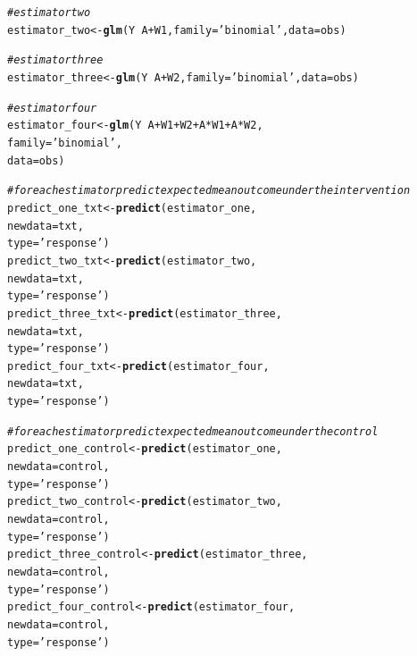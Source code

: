 \documentclass{article}\usepackage[]{graphicx}\usepackage[]{xcolor}
\makeatletter
\newcommand{\hlstr}[1]{\textcolor[rgb]{0.192,0.494,0.8}{#1}}%
\newcommand{\hlcom}[1]{\textcolor[rgb]{0.678,0.584,0.686}{\textit{#1}}}%
\newcommand{\hlopt}[1]{\textcolor[rgb]{0,0,0}{#1}}%
\newcommand{\hlstd}[1]{\textcolor[rgb]{0.345,0.345,0.345}{#1}}%
\newcommand{\hlkwb}[1]{\textcolor[rgb]{0.69,0.353,0.396}{#1}}%
\newcommand{\hlkwc}[1]{\textcolor[rgb]{0.333,0.667,0.333}{#1}}%
\newcommand{\hlkwd}[1]{\textcolor[rgb]{0.737,0.353,0.396}{\textbf{#1}}}%
\newenvironment{kframe}{%
 \def\at@end@of@kframe{}%
 \ifinner\ifhmode%
  \def\at@end@of@kframe{\end{minipage}}%
  \begin{minipage}{\columnwidth}%
 \fi\fi%
 \def\FrameCommand##1{\hskip\@totalleftmargin \hskip-\fboxsep
 \colorbox{shadecolor}{##1}\hskip-\fboxsep
     \hskip-\linewidth \hskip-\@totalleftmargin \hskip\columnwidth}%
 \MakeFramed {\advance\hsize-\width
   \@totalleftmargin\z@ \linewidth\hsize
   \@setminipage}}%
 {\par\unskip\endMakeFramed%
 \at@end@of@kframe}
\newenvironment{knitrout}{}{} %
\makeatother
\begin{document}
\begin{knitrout}
\begin{kframe}
\begin{alltt}
  \hlcom{# estimator two}
  \hlstd{estimator_two} \hlkwb{<-} \hlkwd{glm}\hlstd{(Y} \hlopt{~} \hlstd{A} \hlopt{+} \hlstd{W1,} \hlkwc{family} \hlstd{=} \hlstr{'binomial'}\hlstd{,} \hlkwc{data} \hlstd{= obs)}

  \hlcom{# estimator three}
  \hlstd{estimator_three} \hlkwb{<-} \hlkwd{glm}\hlstd{(Y} \hlopt{~} \hlstd{A} \hlopt{+} \hlstd{W2,} \hlkwc{family} \hlstd{=} \hlstr{'binomial'}\hlstd{,} \hlkwc{data} \hlstd{= obs)}

  \hlcom{# estimator four}
  \hlstd{estimator_four} \hlkwb{<-} \hlkwd{glm}\hlstd{(Y} \hlopt{~} \hlstd{A} \hlopt{+} \hlstd{W1} \hlopt{+} \hlstd{W2} \hlopt{+} \hlstd{A}\hlopt{*}\hlstd{W1} \hlopt{+} \hlstd{A}\hlopt{*}\hlstd{W2,}
                        \hlkwc{family} \hlstd{=} \hlstr{'binomial'}\hlstd{,}
                        \hlkwc{data} \hlstd{= obs)}

  \hlcom{# for each estimator predict expected mean outcome under the intervention}
  \hlstd{predict_one_txt} \hlkwb{<-} \hlkwd{predict}\hlstd{(estimator_one,}
                             \hlkwc{newdata} \hlstd{= txt,}
                             \hlkwc{type} \hlstd{=} \hlstr{'response'}\hlstd{)}
  \hlstd{predict_two_txt} \hlkwb{<-} \hlkwd{predict}\hlstd{(estimator_two,}
                             \hlkwc{newdata} \hlstd{= txt,}
                             \hlkwc{type} \hlstd{=} \hlstr{'response'}\hlstd{)}
  \hlstd{predict_three_txt} \hlkwb{<-} \hlkwd{predict}\hlstd{(estimator_three,}
                               \hlkwc{newdata} \hlstd{= txt,}
                               \hlkwc{type} \hlstd{=} \hlstr{'response'}\hlstd{)}
  \hlstd{predict_four_txt} \hlkwb{<-} \hlkwd{predict}\hlstd{(estimator_four,}
                              \hlkwc{newdata} \hlstd{= txt,}
                              \hlkwc{type} \hlstd{=} \hlstr{'response'}\hlstd{)}

  \hlcom{# for each estimator predict expected mean outcome under the control}
  \hlstd{predict_one_control} \hlkwb{<-} \hlkwd{predict}\hlstd{(estimator_one,}
                                 \hlkwc{newdata} \hlstd{= control,}
                                 \hlkwc{type} \hlstd{=} \hlstr{'response'}\hlstd{)}
  \hlstd{predict_two_control} \hlkwb{<-} \hlkwd{predict}\hlstd{(estimator_two,}
                                 \hlkwc{newdata} \hlstd{= control,}
                                 \hlkwc{type} \hlstd{=} \hlstr{'response'}\hlstd{)}
  \hlstd{predict_three_control} \hlkwb{<-} \hlkwd{predict}\hlstd{(estimator_three,}
                                   \hlkwc{newdata} \hlstd{= control,}
                                   \hlkwc{type} \hlstd{=} \hlstr{'response'}\hlstd{)}
  \hlstd{predict_four_control} \hlkwb{<-} \hlkwd{predict}\hlstd{(estimator_four,}
                                  \hlkwc{newdata} \hlstd{= control,}
                                  \hlkwc{type} \hlstd{=} \hlstr{'response'}\hlstd{)}


\end{alltt}
\end{kframe}
\end{knitrout}
\end{document}
